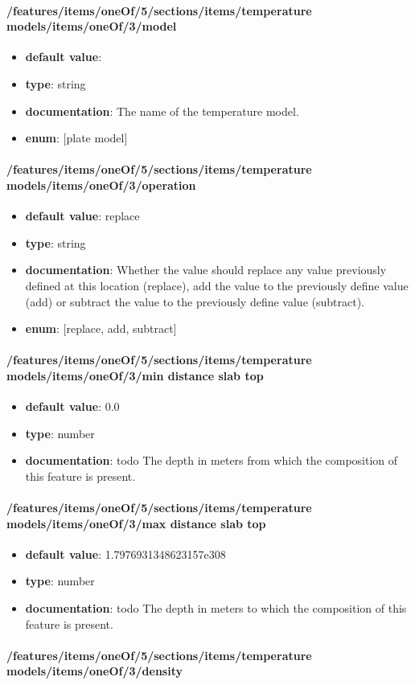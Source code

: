 \paragraph{/features/items/oneOf/5/sections/items/temperature models/items/oneOf/3/model}
\begin{itemize}\item {\bf default value}: 
\item {\bf type}: string
\item {\bf documentation}: The name of the temperature model.
\item {\bf enum}: [plate model]\end{itemize}\paragraph{/features/items/oneOf/5/sections/items/temperature models/items/oneOf/3/operation}
\begin{itemize}\item {\bf default value}: replace
\item {\bf type}: string
\item {\bf documentation}: Whether the value should replace any value previously defined at this location (replace), add the value to the previously define value (add) or subtract the value to the previously define value (subtract).
\item {\bf enum}: [replace, add, subtract]\end{itemize}\paragraph{/features/items/oneOf/5/sections/items/temperature models/items/oneOf/3/min distance slab top}
\begin{itemize}\item {\bf default value}: 0.0
\item {\bf type}: number
\item {\bf documentation}: todo The depth in meters from which the composition of this feature is present.
\end{itemize}\paragraph{/features/items/oneOf/5/sections/items/temperature models/items/oneOf/3/max distance slab top}
\begin{itemize}\item {\bf default value}: 1.7976931348623157e308
\item {\bf type}: number
\item {\bf documentation}: todo The depth in meters to which the composition of this feature is present.
\end{itemize}\paragraph{/features/items/oneOf/5/sections/items/temperature models/items/oneOf/3/density}

